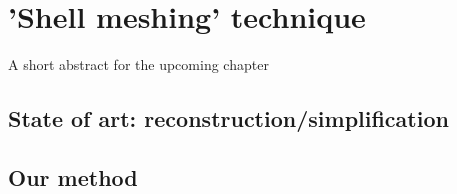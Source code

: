 \chapter{'Shell meshing' technique }
\label{chap10}
\begin{shortAbstract}
A short abstract for the upcoming chapter
\end{shortAbstract}


\section{State of art: reconstruction/simplification}
		
\section{Our method}